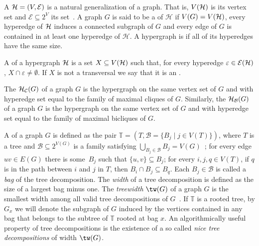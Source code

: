 A  $\mathcal{H} = (V, \mathcal{E})$ is a natural generalization of a graph.
That is, $V(\mathcal{H})$ is its vertex set and $\mathcal{E} \subseteq 2^{V}$ its  set~\citep{hypergraphs}.
A graph $G$ is said to be a  of $\mathcal{H}$ if $V(G) = V(\mathcal{H})$, every hyperedge of $\mathcal{H}$ induces a connected subgraph of $G$ and every edge of $G$ is contained in at least one hyperedge of $\mathcal{H}$.
A hypergraph is  if all of its hyperedges have the same size.

A  of a hypergraph $\mathcal{H}$ is a set $X \subseteq V(\mathcal{H})$ such that, for every hyperedge $\varepsilon \in \mathcal{E}(\mathcal{H})$, $X \cap \varepsilon \neq \emptyset$.
If $X$ is not a transversal we say that it is an .

The  $\mathcal{H}_{\mathcal{C}}(G)$ of a graph $G$ is the hypergraph on the same vertex set of $G$ and with hyperedge set equal to the family of maximal cliques of $G$.
Similarly, the  $\mathcal{H}_{\mathcal{B}}(G)$ of a graph $G$ is the hypergraph on the same vertex set of $G$ and with hyperedge set equal to the family of maximal bicliques of $G$.

A  of a graph $G$ is defined as the pair $\mathbb{T} = \left(T, \mathcal{B} = \{B_j \mid j \in V(T)\}\right)$, where $T$ is a tree and $\mathcal{B} \subseteq 2^{V(G)}$ is a family satisfying $\bigcup_{B_j \in \mathcal{B}} B_j = V(G)$~\citep{treewidth};
for every edge $uv \in E(G)$ there is some~$B_j$ such that $\{u,v\} \subseteq B_j$;
for every $i,j,q \in V(T)$, if $q$ is in the path between $i$ and $j$ in $T$, then $B_i \cap B_j \subseteq B_q$.
Each $B_j \in \mathcal{B}$ is called a \emph{bag} of the tree decomposition.
The \emph{width} of a tree decomposition is defined as the size of a largest bag minus one.
The \emph{treewidth} $\tw(G)$ of a graph $G$ is the smallest width among all valid tree decompositions of $G$~\citep{downey_fellows}.
If $\mathbb{T}$ is a rooted tree, by $G_x$ we will denote the subgraph of $G$ induced by the vertices contained in any bag that belongs to the subtree of $\mathbb{T}$ rooted at bag $x$.
An algorithmically useful property of tree decompositions is the existence of a so called \emph{nice tree decompositions} of width $\tw(G)$.

